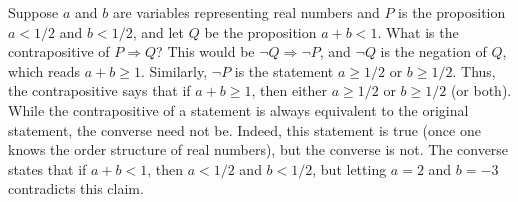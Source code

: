         \begin{example}
            Suppose $a$ and $b$ are variables representing real numbers and $P$
            is the proposition $a<1/2$ and $b<1/2$, and let $Q$ be the
            proposition $a+b<1$. What is the contrapositive of
            $P\Rightarrow{Q}$? This would be $\neg{Q}\Rightarrow\neg{P}$, and
            $\neg{Q}$ is the negation of $Q$, which reads $a+b\geq{1}$.
            Similarly, $\neg{P}$ is the statement $a\geq{1}/2$ or $b\geq{1}/2$.
            Thus, the contrapositive says that if $a+b\geq{1}$, then either
            $a\geq{1}/2$ or $b\geq{1}/2$ (or both). While the contrapositive of
            a statement is always equivalent to the original statement, the
            converse need not be. Indeed, this statement is true (once one knows
            the order structure of real numbers), but the converse is not. The
            converse states that if $a+b<1$, then $a<1/2$ and $b<1/2$, but
            letting $a=2$ and $b=\minus{3}$ contradicts this claim.
        \end{example}